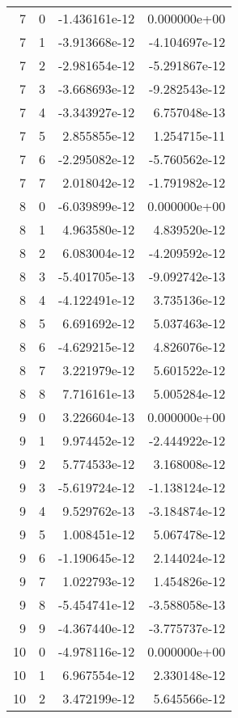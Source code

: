 \begin{tabular}{rrrr}
   7 &    0 & -1.436161e-12 &  0.000000e+00 \\
   7 &    1 & -3.913668e-12 & -4.104697e-12 \\
   7 &    2 & -2.981654e-12 & -5.291867e-12 \\
   7 &    3 & -3.668693e-12 & -9.282543e-12 \\
   7 &    4 & -3.343927e-12 &  6.757048e-13 \\
   7 &    5 &  2.855855e-12 &  1.254715e-11 \\
   7 &    6 & -2.295082e-12 & -5.760562e-12 \\
   7 &    7 &  2.018042e-12 & -1.791982e-12 \\
   8 &    0 & -6.039899e-12 &  0.000000e+00 \\
   8 &    1 &  4.963580e-12 &  4.839520e-12 \\
   8 &    2 &  6.083004e-12 & -4.209592e-12 \\
   8 &    3 & -5.401705e-13 & -9.092742e-13 \\
   8 &    4 & -4.122491e-12 &  3.735136e-12 \\
   8 &    5 &  6.691692e-12 &  5.037463e-12 \\
   8 &    6 & -4.629215e-12 &  4.826076e-12 \\
   8 &    7 &  3.221979e-12 &  5.601522e-12 \\
   8 &    8 &  7.716161e-13 &  5.005284e-12 \\
   9 &    0 &  3.226604e-13 &  0.000000e+00 \\
   9 &    1 &  9.974452e-12 & -2.444922e-12 \\
   9 &    2 &  5.774533e-12 &  3.168008e-12 \\
   9 &    3 & -5.619724e-12 & -1.138124e-12 \\
   9 &    4 &  9.529762e-13 & -3.184874e-12 \\
   9 &    5 &  1.008451e-12 &  5.067478e-12 \\
   9 &    6 & -1.190645e-12 &  2.144024e-12 \\
   9 &    7 &  1.022793e-12 &  1.454826e-12 \\
   9 &    8 & -5.454741e-12 & -3.588058e-13 \\
   9 &    9 & -4.367440e-12 & -3.775737e-12 \\
  10 &    0 & -4.978116e-12 &  0.000000e+00 \\
  10 &    1 &  6.967554e-12 &  2.330148e-12 \\
  10 &    2 &  3.472199e-12 &  5.645566e-12 \\

\end{tabular}

